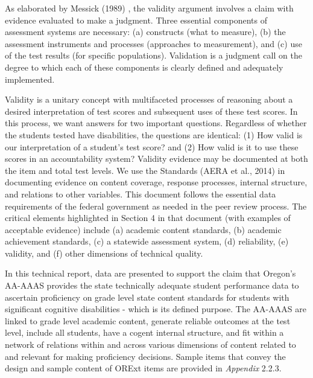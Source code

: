 \documentclass[]{article}
\begin{document}
As elaborated by Messick (1989) , the validity argument involves a claim
with evidence evaluated to make a judgment. Three essential components
of assessment systems are necessary: (a) constructs (what to measure),
(b) the assessment instruments and processes (approaches to
measurement), and (c) use of the test results (for specific
populations). Validation is a judgment call on the degree to which each
of these components is clearly defined and adequately implemented.

Validity is a unitary concept with multifaceted processes of reasoning
about a desired interpretation of test scores and subsequent uses of
these test scores. In this process, we want answers for two important
questions. Regardless of whether the students tested have disabilities,
the questions are identical: (1) How valid is our interpretation of a
student's test score? and (2) How valid is it to use these scores in an
accountability system? Validity evidence may be documented at both the
item and total test levels. We use the Standards (AERA et al., 2014) in
documenting evidence on content coverage, response processes, internal
structure, and relations to other variables. This document follows the
essential data requirements of the federal government as needed in the
peer review process. The critical elements highlighted in Section 4 in
that document (with examples of acceptable evidence) include (a)
academic content standards, (b) academic achievement standards, (c) a
statewide assessment system, (d) reliability, (e) validity, and (f)
other dimensions of technical quality.

In this technical report, data are presented to support the claim that
Oregon's AA-AAAS provides the state technically adequate student
performance data to ascertain proficiency on grade level state content
standards for students with significant cognitive disabilities - which
is its defined purpose. The AA-AAAS are linked to grade level academic
content, generate reliable outcomes at the test level, include all
students, have a cogent internal structure, and fit within a network of
relations within and across various dimensions of content related to and
relevant for making proficiency decisions. Sample items that convey the
design and sample content of ORExt items are provided in \emph{Appendix}
2.2.3.
\end{document}
